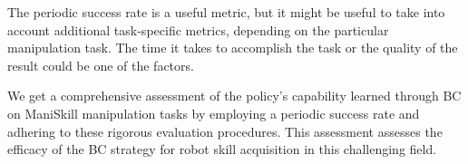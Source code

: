 \documentclass[../report.tex]{subfiles}
\begin{document}
    The periodic success rate is a useful metric, but it might be useful to take into account additional task-specific metrics, depending on the particular manipulation task. The time it takes to accomplish the task or the quality of the result could be one of the factors.

    We get a comprehensive assessment of the policy's capability learned through BC on ManiSkill manipulation tasks by employing a periodic success rate and adhering to these rigorous evaluation procedures. This assessment assesses the efficacy of the BC strategy for robot skill acquisition in this challenging field.
    
\end{document}
